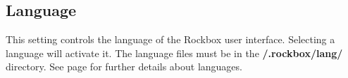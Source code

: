   \subsection{\label{ref:Language}Language}
  This setting controls the language of the Rockbox user interface. Selecting a language will activate it. The language files must be in the \textbf{/.rockbox/lang/} directory. See page \pageref{ref:Loadinglanguages} for further details about languages.
